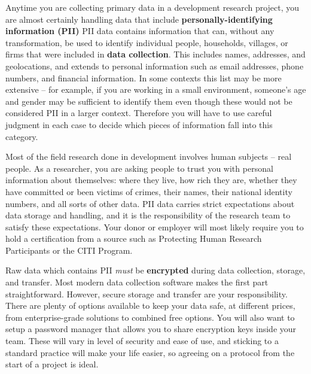 Anytime you are collecting primary data in a development research project,
you are almost certainly handling data that include \textbf{personally-identifying information (PII)}
PII data contains information that can, without any transformation, be used to identify
individual people, households, villages, or firms that were included in \textbf{data collection}.
This includes names, addresses, and geolocations, and extends to personal information
such as email addresses, phone numbers, and financial information.
In some contexts this list may be more extensive --
for example, if you are working in a small environment,
someone's age and gender may be sufficient to identify them
even though these would not be considered PII in a larger context.
Therefore you will have to use careful judgment in each case
to decide which pieces of information fall into this category.

Most of the field research done in development involves human subjects -- real people.
As a researcher, you are asking people to trust you with personal information about themselves:
where they live, how rich they are, whether they have committed or been victims of crimes,
their names, their national identity numbers, and all sorts of other data.
PII data carries strict expectations about data storage and handling,
and it is the responsibility of the research team to satisfy these expectations.
Your donor or employer will most likely require you to hold a certification from a source
such as Protecting Human Research Participants
or the CITI Program.

Raw data which contains PII \textit{must} be \textbf{encrypted}
during data collection, storage, and transfer.
Most modern data collection software makes the first part straightforward.
However, secure storage and transfer are your responsibility.
There are plenty of options available to keep your data safe,
at different prices, from enterprise-grade solutions to combined free options.
You will also want to setup a password manager that allows you to share encryption keys inside your team.
These will vary in level of security and ease of use,
and sticking to a standard practice will make your life easier,
so agreeing on a protocol from the start of a project is ideal.

